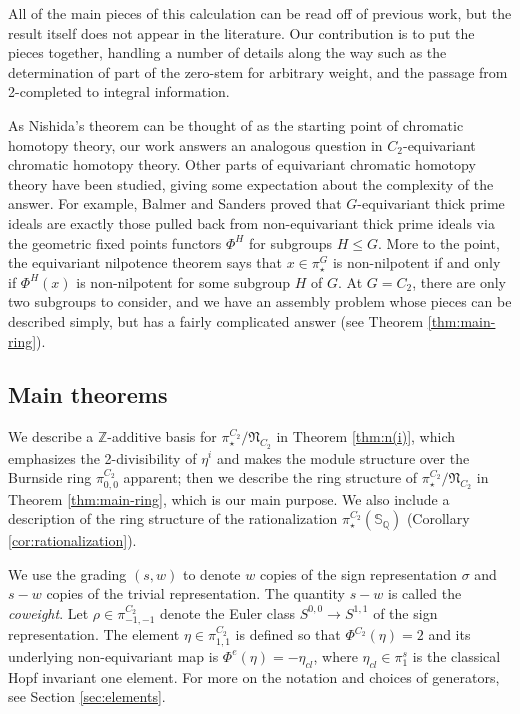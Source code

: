 \documentclass[psamsfonts]{amsart}
\newcommand{\Z}{\mathbb Z}
\newcommand{\fN}{\mathfrak N}
\theoremstyle{definition}
\theoremstyle{remark}
\numberwithin{equation}{section}
\begin{document}
All of the main pieces of this calculation can be read off of previous work, but the
result itself does not appear in the literature. Our contribution is to put the pieces
together, handling a number of details along the way such as
the determination of part of the zero-stem for arbitrary weight, and
the passage from 2-completed to integral information.



As Nishida's theorem can be thought of as the starting point of chromatic homotopy theory, our work answers an analogous question in $C_2$-equivariant chromatic homotopy theory. Other parts of equivariant chromatic homotopy theory have been studied, giving some expectation about the complexity of the answer.
For example, Balmer and Sanders \cite{BS} proved that $G$-equivariant thick prime ideals are exactly those pulled back from non-equivariant thick prime ideals via the geometric fixed points functors $\Phi^H$ for subgroups $H\leq G$. More to the point, the equivariant nilpotence theorem \cite{BS, BGH} says that $x\in\pi_\star^G$ is non-nilpotent if and only if $\Phi^H(x)$ is non-nilpotent for some subgroup $H$ of $G$. At $G=C_2$, there are only two subgroups to consider, and we have an assembly problem whose pieces can be described simply, but has a fairly complicated answer (see Theorem \ref{thm:main-ring}).


\subsection{Main theorems}
We describe a $\Z$-additive basis for $\pi_\star^{C_2}/\fN_{C_2}$ in Theorem \ref{thm:n(i)}, which emphasizes the 2-divisibility of $\eta^i$ and makes the module structure over the Burnside ring $\pi^{C_2}_{0,0}$ apparent; then we describe the ring structure of $\pi_\star^{C_2}/\fN_{C_2}$ in Theorem \ref{thm:main-ring}, which is our main purpose. We also include a description of the ring structure of the rationalization $\pi_\star^{C_2}(\mathbb{S}_\mathbb{Q})$ (Corollary \ref{cor:rationalization}). 

We use the grading $(s,w)$ to denote $w$ copies of the sign representation $\sigma$ and
$s-w$ copies of the trivial representation. The quantity $s-w$ is called the
\emph{coweight}. 
Let $\rho\in\pi_{-1,-1}^{C_2}$ denote the Euler class
$S^{0,0}\to S^{1,1}$ of the sign representation. The element $\eta\in \pi_{1,1}^{C_2}$ is defined so
that $\Phi^{C_2}(\eta)=2$ and its underlying non-equivariant map is $\Phi^e(\eta) = -\eta_{cl}$, where $\eta_{cl}\in \pi_1^s$ is the classical Hopf invariant one element.
For more on the notation and
choices of generators, see Section \ref{sec:elements}. 
\end{document}
